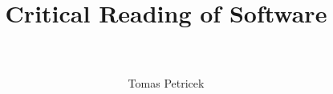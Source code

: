 \documentclass[fleqn,11pt]{report}
\begin{document}
\title{\Huge \textbf{Critical Reading of Software}\\~\\}
\author{Tomas Petricek}
\maketitle

%
%
%



\end{document}
